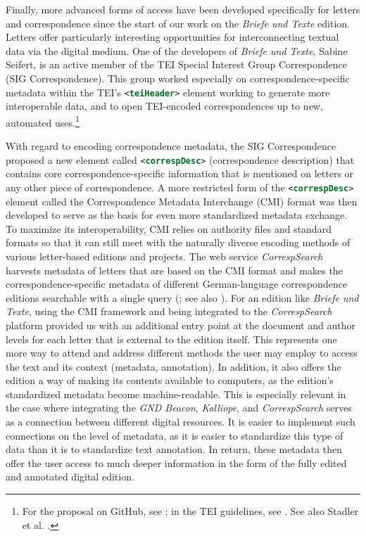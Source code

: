 \begin{paper}
Finally, more advanced forms of access have been developed specifically for
letters and correspondence since the start of our work on the \emph{Briefe und Texte}
edition. Letters offer particularly interesting opportunities for
interconnecting textual data via the digital medium. One of the developers
of \emph{Briefe und Texte}, Sabine Seifert, is an active member of the
TEI Special Interest Group Correspondence (SIG Correspondence). This
group worked especially on correspondence-specific metadata within the
TEI's \lstinline[language=XML]!<teiHeader>! element working to generate more
interoperable data, and to open TEI-encoded correspondences up to new,
automated uses.\footnote{For the proposal on GitHub, see \citealt{tei_correspondence_sig_correspdesc_2019}; 
in the TEI guidelines, see \citealt{consortium_tei_nodate}. See also Stadler et al. \citeyear{stadler_towards_2016}.}

With regard to encoding correspondence metadata, the SIG Correspondence proposed a
new element called \lstinline[language=XML]!<correspDesc>! (correspondence
description) that contains core correspondence-specific information
that is mentioned on letters or any other piece of correspondence. A more restricted form of the
\lstinline[language=XML]!<correspDesc>! element called the Correspondence Metadata Interchange (CMI) format was then developed to serve 
as the basis for even more standardized metadata exchange. To maximize its interoperability, CMI relies on authority files and standard formats so that it can still meet
with the naturally diverse encoding methods of various letter-based editions and
projects. The web service \emph{CorrespSearch} 
harvests metadata of letters that are 
based on the CMI format and makes the correspondence-specific metadata
of different German-language correspondence editions searchable with a single
query (\citealt{dumont_correspsearch_2020}; see also \citealt{dumont_correspsearch_2018}). For an edition like \emph{Briefe und Texte}, using the CMI framework and
being integrated to the \emph{CorrespSearch} platform provided us with
an additional entry point at the document and author levels for each
letter that is external to the edition itself. This represents one more way to
attend and address different methods the user may employ to access the text and its context (metadata,
annotation). In addition, it also offers the edition a way of making its contents available to
computers, as the edition's standardized metadata become machine-readable. This is especially relevant in the
case where integrating the \emph{GND Beacon}, \emph{Kalliope}, and
\emph{CorrespSearch} serves as a connection between different digital resources. It is
easier to implement such connections on the level of metadata, as it is easier to standardize
this type of data than it is to standardize text annotation. In return, these
metadata then offer the user access to
much deeper information in the form of the fully edited and annotated
digital edition.


\end{paper}
